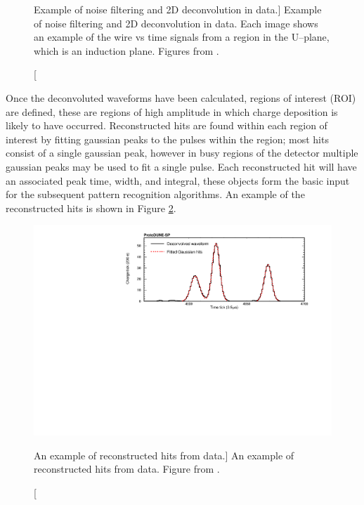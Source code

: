 \begin{figure}
	\caption
	[Example of noise filtering and 2D deconvolution in \protodune{} data.]
	{Example of noise filtering and 2D deconvolution in \protodune{} data. Each
	image shows an example of the wire vs time signals from a region in the
	U--plane, which is an induction plane. Figures from \cite{protoduneperf}.}

	\label{fig:2d_deconv}

\end{figure}

Once the deconvoluted waveforms have been calculated, regions of interest (ROI) 
are defined, these are regions of high amplitude in which charge deposition is
likely to have occurred. Reconstructed hits are found within each region of
interest by fitting gaussian peaks to the pulses within the region; most hits
consist of a single gaussian peak, however in busy regions of the detector
multiple gaussian peaks may be used to fit a single pulse. Each reconstructed
hit will have an associated peak time, width, and integral, these objects form
the basic input for the subsequent pattern recognition algorithms. An example of
the reconstructed hits is shown in Figure \ref{fig:gaushit}.

\begin{figure}

	\centering

	\includegraphics[width=\textwidth]{figures/gaushit.pdf}

	\caption
	[An example of reconstructed hits from \protodune{} data.]
	{An example of reconstructed hits from \protodune{} data. Figure from 
	\cite{protoduneperf}.}

	\label{fig:gaushit}

\end{figure}

